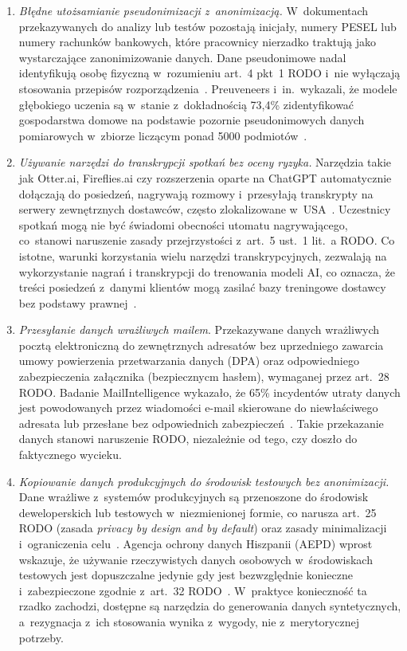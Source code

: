 \begin{enumerate}[label=(\roman*)]
\item \textit{Błędne utożsamianie pseudonimizacji z~anonimizacją.}
W~dokumentach przekazywanych do analizy lub testów pozostają inicjały, numery PESEL
lub numery rachunków bankowych, które pracownicy nierzadko traktują jako
wystarczające zanonimizowanie danych. Dane pseudonimowe nadal
identyfikują osobę fizyczną w~rozumieniu art.~4 pkt~1 RODO i~nie wyłączają
stosowania przepisów rozporządzenia~\autocite{aepd_test_environments}.
Preuveneers i~in.\ wykazali, że modele głębokiego uczenia
są w~stanie z~dokładnością 73,4\% zidentyfikować gospodarstwa domowe
na podstawie pozornie pseudonimowych danych pomiarowych w~zbiorze liczącym
ponad 5000 podmiotów~\autocite{preuveneers2024repseudo}.

\item \textit{Używanie narzędzi do transkrypcji spotkań bez oceny ryzyka.}
Narzędzia takie jak Otter.ai, Fireflies.ai czy rozszerzenia oparte na ChatGPT
automatycznie dołączają do posiedzeń, nagrywają rozmowy i~przesyłają transkrypty
na serwery zewnętrznych dostawców, często zlokalizowane w~USA~\autocite{legal_io_transcription}.
Uczestnicy spotkań mogą nie być świadomi obecności utomatu nagrywającego,
co~stanowi naruszenie zasady przejrzystości z~art.~5 ust.~1 lit.~a RODO.
Co istotne, warunki korzystania wielu  narzędzi transkrypcyjnych, zezwalają na
wykorzystanie nagrań i transkrypcji do trenowania modeli AI, co oznacza, że treści posiedzeń
z~danymi klientów mogą zasilać bazy treningowe dostawcy bez podstawy prawnej~\autocite{linkedin_transcription_risk}.

\item \textit{Przesyłanie danych wrażliwych mailem}.
Przekazywane danych wrażliwych pocztą elektroniczną do zewnętrznych adresatów
bez uprzedniego zawarcia umowy powierzenia przetwarzania danych (DPA) oraz odpowiedniego zabezpieczenia załącznika (bezpiecznycm hasłem), wymaganej przez art.~28 RODO.
Badanie MailIntelligence wykazało, że 65\% incydentów utraty danych
jest powodowanych przez wiadomości e-mail skierowane do niewłaściwego adresata
lub przesłane bez odpowiednich zabezpieczeń~\autocite{mailintelligence_2024}.
Takie przekazanie danych  stanowi naruszenie RODO, niezależnie od tego, czy doszło do faktycznego wycieku.

\item \textit{Kopiowanie danych produkcyjnych do środowisk testowych bez anonimizacji.}
Dane wrażliwe z~systemów produkcyjnych są przenoszone do środowisk deweloperskich
lub testowych w~niezmienionej formie, co narusza art.~25 RODO (zasada
\textit{privacy by design and by default}) oraz zasady minimalizacji i~ograniczenia celu~\autocite{aepd_test_environments}.
Agencja ochrony danych Hiszpanii (AEPD) wprost wskazuje, że używanie rzeczywistych
danych osobowych w~środowiskach testowych jest dopuszczalne jedynie gdy jest bezwzględnie konieczne i~zabezpieczone zgodnie z~art.~32 RODO~\autocite{aepd_test_environments}.
W~praktyce konieczność ta rzadko zachodzi, dostępne są narzędzia do generowania
danych syntetycznych, a~rezygnacja z~ich stosowania wynika z~wygody, nie z~merytorycznej potrzeby.


\end{enumerate}
